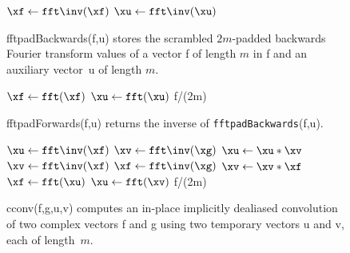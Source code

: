 \documentclass[final]{siamltex}
\begin{document}
\begin{figure}[htbp]
\begin{minipage}{0.5\linewidth}
\begin{procedure}[H]
  $\xf \leftarrow \fft\inv(\xf)$\;
  $\xu \leftarrow \fft\inv(\xu)$\;
  \caption{fftpadBackwards({\sf f},{\sf u}) stores the scrambled
$2m$-padded backwards Fourier transform values of a vector
{\sf f} of length $m$ in {\sf f} and an auxiliary vector~{\sf u} of length $m$.}\label{fftpadBackwards}
\end{procedure}
\def\fftpadBackwards{{\tt fftpadBackwards}}
\begin{function}[H]
  $\xf \leftarrow \fft(\xf)$\;
  $\xu \leftarrow \fft(\xu)$\;
  \Return f/(2m)\;
  \caption{fftpadForwards({\sf f},{\sf u}) returns the
inverse of \fftpadBackwards({\sf f},{\sf u}).}\label{fftpadForwards} 
\end{function}
%
\end{minipage}
\begin{minipage}{0.49\linewidth}
\begin{function}[H]
  $\xu \leftarrow \fft\inv(\xf)$\;
  $\xv \leftarrow \fft\inv(\xg)$\;
  $\xu \leftarrow \xu * \xv$\;
  \medskip
  $\xv \leftarrow \fft\inv(\xf)$\;
  $\xf \leftarrow \fft\inv(\xg)$\;
  $\xv \leftarrow \xv * \xf$\;
  \medskip
  $\xf \leftarrow \fft(\xu)$\;
  $\xu \leftarrow \fft(\xv)$\;
  \medskip
  \Return f/(2m)\;
\caption{cconv({\sf f},{\sf g},{\sf u},{\sf v}) computes
an in-place implicitly dealiased convolution of two complex vectors {\sf f}
and {\sf g} using two temporary vectors {\sf u} and {\sf v}, each of
length~$m$.}\label{cconv}
\end{function}
\end{minipage}
\end{figure}
\end{document}
